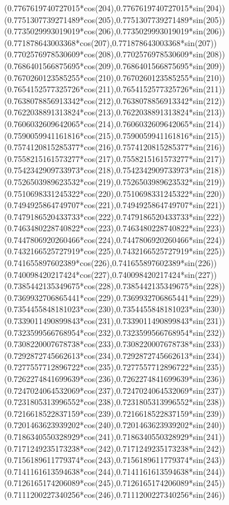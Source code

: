 {({0.7767619740727015*cos(204)},{0.7767619740727015*sin(204)})
({0.7751307739271489*cos(205)},{0.7751307739271489*sin(205)})
({0.7735029993019019*cos(206)},{0.7735029993019019*sin(206)})
({0.771878643003368*cos(207)},{0.771878643003368*sin(207)})
({0.7702576978530609*cos(208)},{0.7702576978530609*sin(208)})
({0.7686401566875695*cos(209)},{0.7686401566875695*sin(209)})
({0.7670260123585255*cos(210)},{0.7670260123585255*sin(210)})
({0.7654152577325726*cos(211)},{0.7654152577325726*sin(211)})
({0.7638078856913342*cos(212)},{0.7638078856913342*sin(212)})
({0.7622038891313824*cos(213)},{0.7622038891313824*sin(213)})
({0.7606032609642065*cos(214)},{0.7606032609642065*sin(214)})
({0.7590059941161816*cos(215)},{0.7590059941161816*sin(215)})
({0.7574120815285377*cos(216)},{0.7574120815285377*sin(216)})
({0.7558215161573277*cos(217)},{0.7558215161573277*sin(217)})
({0.7542342909733973*cos(218)},{0.7542342909733973*sin(218)})
({0.7526503989623532*cos(219)},{0.7526503989623532*sin(219)})
({0.7510698331245322*cos(220)},{0.7510698331245322*sin(220)})
({0.7494925864749707*cos(221)},{0.7494925864749707*sin(221)})
({0.7479186520433733*cos(222)},{0.7479186520433733*sin(222)})
({0.7463480228740822*cos(223)},{0.7463480228740822*sin(223)})
({0.7447806920260466*cos(224)},{0.7447806920260466*sin(224)})
({0.7432166525727919*cos(225)},{0.7432166525727919*sin(225)})
({0.741655897602389*cos(226)},{0.741655897602389*sin(226)})
({0.740098420217424*cos(227)},{0.740098420217424*sin(227)})
({0.7385442135349675*cos(228)},{0.7385442135349675*sin(228)})
({0.7369932706865441*cos(229)},{0.7369932706865441*sin(229)})
({0.7354455848181023*cos(230)},{0.7354455848181023*sin(230)})
({0.7339011490899843*cos(231)},{0.7339011490899843*sin(231)})
({0.7323599566768954*cos(232)},{0.7323599566768954*sin(232)})
({0.7308220007678738*cos(233)},{0.7308220007678738*sin(233)})
({0.7292872745662613*cos(234)},{0.7292872745662613*sin(234)})
({0.7277557712896722*cos(235)},{0.7277557712896722*sin(235)})
({0.7262274841699639*cos(236)},{0.7262274841699639*sin(236)})
({0.7247024064532069*cos(237)},{0.7247024064532069*sin(237)})
({0.7231805313996552*cos(238)},{0.7231805313996552*sin(238)})
({0.7216618522837159*cos(239)},{0.7216618522837159*sin(239)})
({0.7201463623939202*cos(240)},{0.7201463623939202*sin(240)})
({0.7186340550328929*cos(241)},{0.7186340550328929*sin(241)})
({0.7171249235173238*cos(242)},{0.7171249235173238*sin(242)})
({0.7156189611779374*cos(243)},{0.7156189611779374*sin(243)})
({0.7141161613594638*cos(244)},{0.7141161613594638*sin(244)})
({0.7126165174206089*cos(245)},{0.7126165174206089*sin(245)})
({0.7111200227340256*cos(246)},{0.7111200227340256*sin(246)})
}
